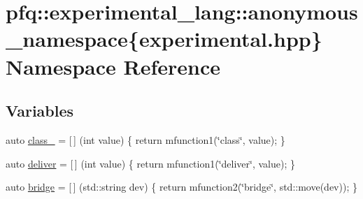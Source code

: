 \hypertarget{namespacepfq_1_1experimental__lang_1_1anonymous__namespace_02experimental_8hpp_03}{\section{pfq\+:\+:experimental\+\_\+lang\+:\+:anonymous\+\_\+namespace\{experimental.\+hpp\} Namespace Reference}
\label{namespacepfq_1_1experimental__lang_1_1anonymous__namespace_02experimental_8hpp_03}
}
\subsection*{Variables}
\begin{DoxyCompactItemize}
\item 
auto \hyperlink{namespacepfq_1_1experimental__lang_1_1anonymous__namespace_02experimental_8hpp_03_aab201738a448e9f995300724e6c1de44}{class\+\_\+} = \mbox{[}$\,$\mbox{]} (int value) \{ return mfunction1(\char`\"{}class\char`\"{}, value); \}
\item 
auto \hyperlink{namespacepfq_1_1experimental__lang_1_1anonymous__namespace_02experimental_8hpp_03_a2ca2e5f03bcea1059d5f334b2ee73ffe}{deliver} = \mbox{[}$\,$\mbox{]} (int value) \{ return mfunction1(\char`\"{}deliver\char`\"{}, value); \}
\item 
auto \hyperlink{namespacepfq_1_1experimental__lang_1_1anonymous__namespace_02experimental_8hpp_03_a526de05a8841ca47c01174ed2fbc7a81}{bridge} = \mbox{[}$\,$\mbox{]} (std\+::string dev) \{ return mfunction2(\char`\"{}bridge\char`\"{}, std\+::move(dev)); \}
\end{DoxyCompactItemize}


